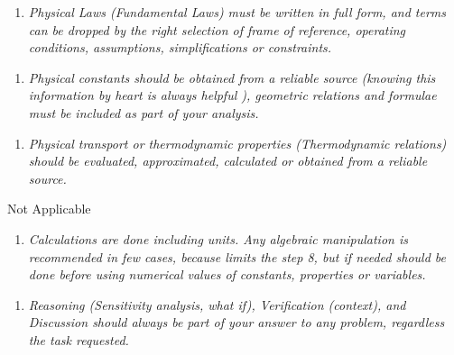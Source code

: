 \documentclass{article}
\begin{document}
\begin{enumerate}[resume]
\item \textit{Physical Laws (Fundamental Laws) must be written in full form, and terms can be dropped by the right selection of frame of reference, operating conditions, assumptions, simplifications or constraints.}
\end{enumerate}



\begin{enumerate}[resume]
\item \textit{Physical constants should be obtained from a reliable source (knowing this information by heart is always helpful ), geometric relations and formulae must be included as part of your analysis.}
\end{enumerate}



\begin{enumerate}[resume]
\item \textit{Physical transport or thermodynamic properties (Thermodynamic relations) should be evaluated, approximated, calculated or obtained from a reliable source.}
\end{enumerate}

Not Applicable

\begin{enumerate}[resume]
\item \textit{Calculations are done including units. Any algebraic manipulation is recommended in few cases, because limits the step 8, but if needed should be done before using numerical values of constants, properties or variables.}
\end{enumerate}



\begin{enumerate}[resume]
\item \textit{Reasoning (Sensitivity analysis, what if), Verification (context), and Discussion should always be part of your answer to any problem, regardless the task requested.}
\end{enumerate}



\printbibliography[title={References}]
\end{document}
